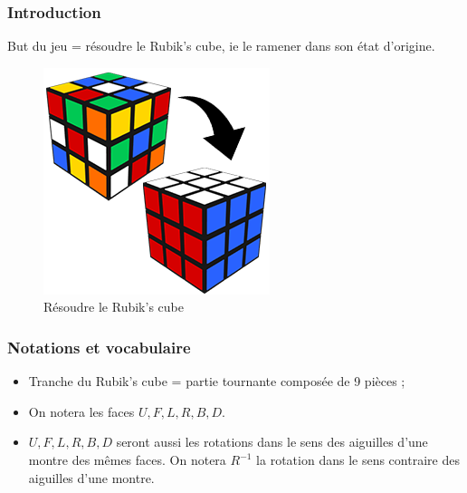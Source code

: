 \documentclass[10pt,notheorems]{beamer}
\theoremstyle{plain}
\theoremstyle{definition}
\theoremstyle{plain}
\theoremstyle{plain}
\theoremstyle{plain}
\theoremstyle{remark}
\begin{document}
\begin{frame}
  \frametitle{Introduction}
  But du jeu = résoudre le Rubik's cube, ie le ramener dans son état d'origine.

  \begin{figure}
    \includegraphics[scale=0.5]{figures/non-resolu.png}
    \caption{Résoudre le Rubik's cube}
    \label{}
  \end{figure}
\end{frame}

\begin{frame}
  \frametitle{Notations et vocabulaire}
  \begin{itemize}
    \item Tranche du Rubik's cube = partie tournante composée de 9 pièces ;
    \item On notera les faces $ U, F, L, R, B, D$.
    \item $U, F, L, R, B, D$ seront aussi les rotations dans le sens des aiguilles d'une montre des mêmes faces. On notera $R ^{-1} $ la rotation dans le sens contraire des aiguilles d'une montre.
  \end{itemize}
\end{frame}
\end{document}
